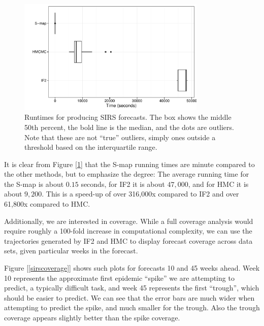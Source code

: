     \begin{figure}
        \centering
        \captionsetup{width=.8\linewidth}
        \includegraphics[width=0.8\textwidth]{./images/timeplot.pdf}
        \caption{Runtimes for producing SIRS forecasts. The box shows the middle 50th percent, the bold line is the median, and the dots are outliers. Note that these are not ``true'' outliers, simply ones outside a threshold based on the interquartile range. \label{sirstimeplot}}
    \end{figure}

    It is clear from Figure [\ref{sirstimeplot}] that the S-map running times are minute compared to the other methods, but to emphasize the degree: The average running time for the S-map is about $0.15$ seconds, for IF2 it is about $47,000$, and for HMC it is about $9,200$. This is a speed-up of over 316,000x compared to IF2 and over 61,800x compared to HMC.

    Additionally, we are interested in coverage. While a full coverage analysis would require roughly a 100-fold increase in computational complexity, we can use the trajectories generated by IF2 and HMC to display forecast coverage across data sets, given particular weeks in the forecast.

    Figure [\ref{sirscoverage}] shows such plots for forecasts 10 and 45 weeks ahead. Week 10 represents the approximate first epidemic ``spike'' we are attempting to predict, a typically difficult task, and week 45 represents the first ``trough'', which should be easier to predict. We can see that the error bars are much wider when attempting to predict the spike, and much smaller for the trough. Also the trough coverage appears slightly better than the spike coverage.

